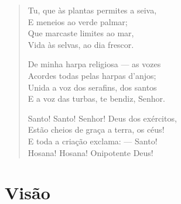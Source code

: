 \begin{verse}
Tu, que às plantas permites a seiva,\\
E meneios ao verde palmar;\\
Que marcaste limites ao mar,\\
Vida às selvas, ao dia frescor.

De minha harpa religiosa --- as vozes\\
Acordes todas pelas harpas d'anjos;\\
Unida a voz dos serafins, dos santos\\
E a voz das turbas, te bendiz, Senhor.

\pagebreak

Santo! Santo! Senhor! Deus dos exércitos,\\
Estão cheios de graça a terra, os céus!\\
E toda a criação exclama: --- Santo!\\
Hosana! Hosana! Onipotente Deus!
\end{verse}

\chapter{Visão}

